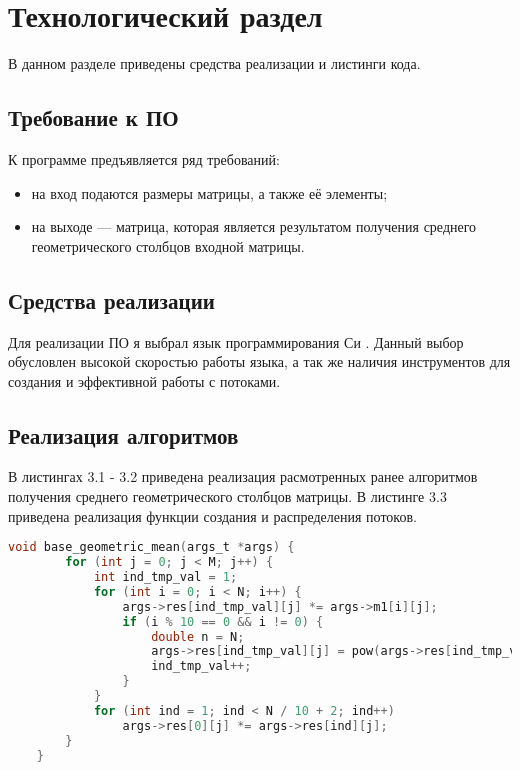 \chapter{Технологический раздел}
\label{cha:technological}

    В данном разделе приведены средства реализации и листинги кода.

    \section{Требование к ПО}
    
    К программе предъявляется ряд требований:
    
    \begin{itemize}
    	\item на вход подаются размеры матрицы, а также её элементы;
    	\item на выходе — матрица, которая является результатом получения среднего геометрического столбцов входной матрицы.
    \end{itemize}
    
    \section{Средства реализации}
    Для реализации ПО я выбрал язык программирования Си \cite{C}. Данный выбор обусловлен высокой скоростью работы языка, а так же наличия инструментов для создания и эффективной работы с потоками.
    
    \section{Реализация алгоритмов}
    
    В листингах 3.1 - 3.2 приведена реализация расмотренных ранее алгоритмов получения среднего геометрического столбцов матрицы.
    В листинге 3.3 приведена реализация функции создания и распределения потоков.
    
    \begin{lstlisting}[label=some-code,caption=Функция получения среднего геометрического столбцов матрицы обычным способом, language=C]
    void base_geometric_mean(args_t *args) {
        for (int j = 0; j < M; j++) {
            int ind_tmp_val = 1;
            for (int i = 0; i < N; i++) {
                args->res[ind_tmp_val][j] *= args->m1[i][j];
                if (i % 10 == 0 && i != 0) {
                    double n = N;
                    args->res[ind_tmp_val][j] = pow(args->res[ind_tmp_val][j], static_cast<double>(1) / n);
                    ind_tmp_val++;
                }
            }
            for (int ind = 1; ind < N / 10 + 2; ind++)
                args->res[0][j] *= args->res[ind][j];
        }
    }
    \end{lstlisting}
    
